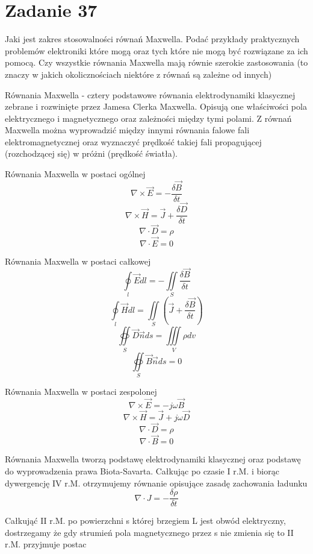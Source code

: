 \section*{Zadanie 37}
\begin{task}
Jaki jest zakres stosowalności równań Maxwella. Podać przykłady praktycznych problemów elektroniki które mogą oraz tych które nie mogą być rozwiązane za ich pomocą. Czy wszystkie równania Maxwella mają równie szerokie zastosowania (to znaczy w jakich okolicznościach niektóre z równań są zależne od innych) \\
\end{task}

\begin{solution}
Równania Maxwella - cztery podstawowe równania elektrodynamiki klasycznej zebrane i rozwinięte przez Jamesa Clerka Maxwella. Opisują one właściwości pola elektrycznego i magnetycznego oraz zależności między tymi polami. Z równań Maxwella można wyprowadzić między innymi równania falowe fali elektromagnetycznej oraz wyznaczyć prędkość takiej fali propagującej (rozchodzącej się) w próżni (prędkość światła).


Równania Maxwella w postaci ogólnej 
$$ \nabla \times \vec{E} = -  \frac{ \delta  \vec{B} }{\delta t}  $$
 $$\nabla \times \vec{H} =  \vec{J} + \frac{ \delta  \vec{D} }{\delta t} $$
$$\nabla  \cdot \vec{D} =  \rho $$
$$\nabla  \cdot \vec{E} =  0  $$

Równania Maxwella w postaci całkowej \\
 $$\oint\limits_{l}\vec{E}dl = - \iint\limits_{S}\frac{\delta \vec{B}}{\delta t}$$
 $$\oint\limits_{l}\vec{H}dl =  \iint\limits_{S}( \vec{J} + \frac{\delta \vec{B}}{\delta t} )  $$
$$\oiint\limits_{S} \vec{D} \vec{n} ds = \iiint\limits_{V} \rho dv $$
$$\oiint\limits_{S} \vec{B} \vec{n} ds = 0 $$

Równania Maxwella w postaci zespolonej \\
$$\nabla \times \vec{E} = -j \omega \vec{B} $$
$$\nabla \times \vec{H} = \vec{J} + j\omega\vec{D} $$
$$\nabla \cdot \vec{D} = \rho $$
$$\nabla \cdot \vec{B} = 0 $$


Równania Maxwella tworzą podstawę elektrodynamiki klasycznej oraz podstawę do wyprowadzenia prawa Biota-Savarta. Całkując po czasie I r.M. i biorąc dywergencję IV r.M. otrzymujemy równanie opisujące zasadę zachowania ładunku
$$\nabla \cdot J = -  \frac{\delta \rho}{\delta t} $$

Całkująć II r.M. po powierzchni s której brzegiem L jest obwód elektryczny, dostrzegamy że gdy strumień pola magnetycznego przez s nie zmienia się to II r.M. przyjmuje postac 


\end{solution}
